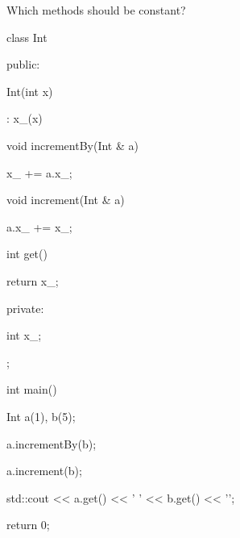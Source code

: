 Which methods should be constant?



\begin{consolethree}[escapeinside=||]

class Int

{

public:

    Int(int x)

        : x_(x)

    {}

    void incrementBy(Int & a)

    {

        x_ += a.x_;

    }

    void increment(Int & a)

    {

        a.x_ += x_;

    }

    int get()

    {

        return x_;

    }

private:

    int x_;

};



int main()

{

    Int a(1), b(5);

    a.incrementBy(b);

    a.increment(b);

    std::cout << a.get() << ' ' << b.get() << '\n';

    return 0;

}

\end{consolethree}

